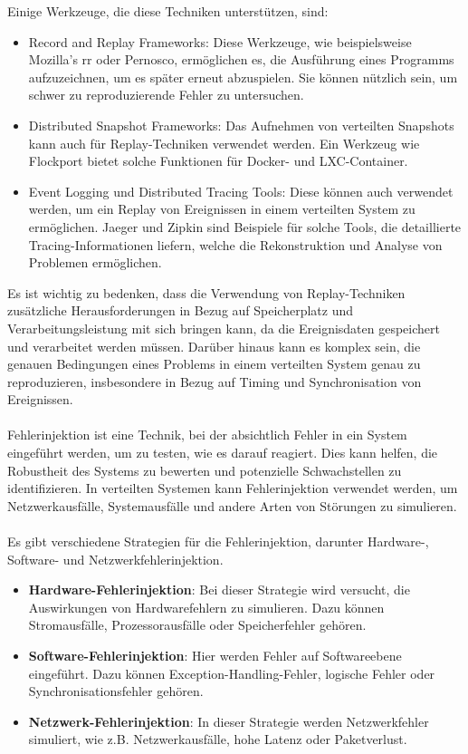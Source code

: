 Einige Werkzeuge, die diese Techniken unterstützen, sind:
\begin{itemize}
\item Record and Replay Frameworks: Diese Werkzeuge, wie beispielsweise Mozilla's rr oder Pernosco, ermöglichen es, die Ausführung eines Programms aufzuzeichnen, um es später erneut abzuspielen. Sie können nützlich sein, um schwer zu reproduzierende Fehler zu untersuchen.
\item Distributed Snapshot Frameworks: Das Aufnehmen von verteilten Snapshots kann auch für Replay-Techniken verwendet werden. Ein Werkzeug wie Flockport bietet solche Funktionen für Docker- und LXC-Container.
\item Event Logging und Distributed Tracing Tools: Diese können auch verwendet werden, um ein Replay von Ereignissen in einem verteilten System zu ermöglichen. Jaeger und Zipkin sind Beispiele für solche Tools, die detaillierte Tracing-Informationen liefern, welche die Rekonstruktion und Analyse von Problemen ermöglichen.
\end{itemize}
Es ist wichtig zu bedenken, dass die Verwendung von Replay-Techniken zusätzliche Herausforderungen in Bezug auf Speicherplatz und Verarbeitungsleistung mit sich bringen kann, da die Ereignisdaten gespeichert und verarbeitet werden müssen. Darüber hinaus kann es komplex sein, die genauen Bedingungen eines Problems in einem verteilten System genau zu reproduzieren, insbesondere in Bezug auf Timing und Synchronisation von Ereignissen.
\\\\
Fehlerinjektion ist eine Technik, bei der absichtlich Fehler in ein System eingeführt werden, um zu testen, wie es darauf reagiert. Dies kann helfen, die Robustheit des Systems zu bewerten und potenzielle Schwachstellen zu identifizieren. In verteilten Systemen kann Fehlerinjektion verwendet werden, um Netzwerkausfälle, Systemausfälle und andere Arten von Störungen zu simulieren.
\\\\
Es gibt verschiedene Strategien für die Fehlerinjektion, darunter Hardware-, Software- und Netzwerkfehlerinjektion.
\begin{itemize}
\item \textbf{Hardware-Fehlerinjektion}: Bei dieser Strategie wird versucht, die Auswirkungen von Hardwarefehlern zu simulieren. Dazu können Stromausfälle, Prozessorausfälle oder Speicherfehler gehören.
\item \textbf{Software-Fehlerinjektion}: Hier werden Fehler auf Softwareebene eingeführt. Dazu können Exception-Handling-Fehler, logische Fehler oder Synchronisationsfehler gehören.
\item \textbf{Netzwerk-Fehlerinjektion}: In dieser Strategie werden Netzwerkfehler simuliert, wie z.B. Netzwerkausfälle, hohe Latenz oder Paketverlust.
\end{itemize}
